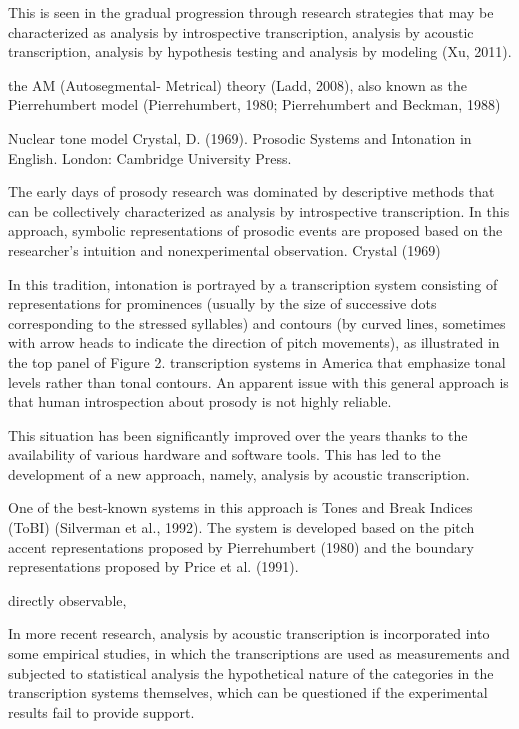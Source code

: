 This is seen in the gradual progression through research strategies that may be characterized as analysis by introspective transcription, analysis by acoustic transcription, analysis by hypothesis testing and analysis by modeling (Xu, 2011). 

the AM (Autosegmental- Metrical) theory (Ladd, 2008), also known as the Pierrehumbert model (Pierrehumbert, 1980; Pierrehumbert and Beckman, 1988)

Nuclear tone model
Crystal, D. (1969). Prosodic Systems and Intonation in English. London: Cambridge University Press.

The early days of prosody research was dominated by descriptive methods that can be collectively characterized as analysis by introspective transcription. In this approach, symbolic representations of prosodic events are proposed based on the researcher’s intuition and nonexperimental observation. Crystal (1969)

In this tradition, intonation is portrayed by a transcription system consisting of representations for prominences (usually by the size of successive dots corresponding to the stressed syllables) and contours (by curved lines, sometimes with arrow heads to indicate the direction of pitch movements), as illustrated in the top panel of Figure 2. transcription systems in America that emphasize tonal levels rather than tonal contours. An apparent issue with this general approach is that human
introspection about prosody is not highly reliable.

This situation has been significantly improved over the years thanks to the availability of various hardware and software tools. This has led to the development of a new approach, namely, analysis by acoustic transcription.

One of the best-known systems in this approach is Tones and Break Indices (ToBI) (Silverman et al., 1992). The system is developed based on the pitch accent representations proposed by Pierrehumbert (1980) and the boundary representations proposed by Price et al. (1991). 

directly observable, 

In more recent research, analysis by acoustic transcription is incorporated into some empirical studies, in which the transcriptions are used as measurements and subjected to statistical analysis
the hypothetical nature of the categories in the transcription systems themselves, which can be questioned if the experimental results fail to provide support. 

